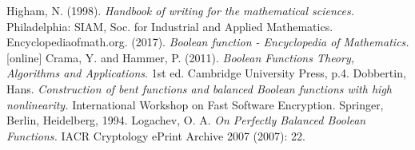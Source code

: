 \documentclass[12pt,a4paper,openright]{report}
\begin{document}
    




\begin{thebibliography}{20}
     Higham, N. (1998). \emph{Handbook of writing for the mathematical sciences.} Philadelphia: SIAM, Soc. for Industrial and Applied Mathematics.
     Encyclopediaofmath.org. (2017). \emph{Boolean function - Encyclopedia of Mathematics.} [online] 
     Crama, Y. and Hammer, P. (2011). \emph{Boolean Functions Theory, Algorithms and Applications}. 1st ed. Cambridge University Press, p.4.
     Dobbertin, Hans. \emph{Construction of bent functions and balanced Boolean functions with high nonlinearity.} International Workshop on Fast Software Encryption. Springer, Berlin, Heidelberg, 1994.
     Logachev, O. A. \emph{On Perfectly Balanced Boolean Functions.} IACR Cryptology ePrint Archive 2007 (2007): 22.
\end{thebibliography}
\end{document}
